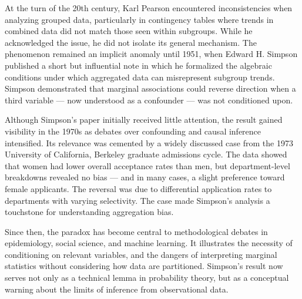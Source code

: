 \begin{historical}
At the turn of the 20th century, Karl Pearson encountered inconsistencies when analyzing grouped data, particularly in contingency tables where trends in combined data did not match those seen within subgroups. While he acknowledged the issue, he did not isolate its general mechanism. The phenomenon remained an implicit anomaly until 1951, when Edward H. Simpson published a short but influential note in which he formalized the algebraic conditions under which aggregated data can misrepresent subgroup trends. Simpson demonstrated that marginal associations could reverse direction when a third variable — now understood as a confounder — was not conditioned upon.

Although Simpson's paper initially received little attention, the result gained visibility in the 1970s as debates over confounding and causal inference intensified. Its relevance was cemented by a widely discussed case from the 1973 University of California, Berkeley graduate admissions cycle. The data showed that women had lower overall acceptance rates than men, but department-level breakdowns revealed no bias — and in many cases, a slight preference toward female applicants. The reversal was due to differential application rates to departments with varying selectivity. The case made Simpson’s analysis a touchstone for understanding aggregation bias.

Since then, the paradox has become central to methodological debates in epidemiology, social science, and machine learning. It illustrates the necessity of conditioning on relevant variables, and the dangers of interpreting marginal statistics without considering how data are partitioned. Simpson's result now serves not only as a technical lemma in probability theory, but as a conceptual warning about the limits of inference from observational data.
\end{historical}
